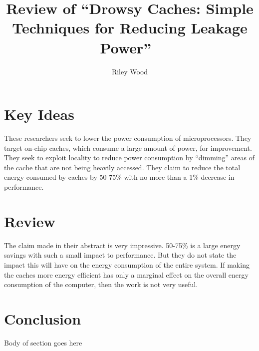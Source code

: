 \documentclass{article}
\title{Review of ``Drowsy Caches: Simple Techniques for Reducing Leakage
Power''~\cite{drowsy}}
\author{Riley Wood}
\begin{document}
\maketitle


\section*{Key Ideas}
These researchers seek to lower the power consumption of microprocessors. They
target on-chip caches, which consume a large amount of power, for improvement.
They seek to exploit locality to reduce power consumption by ``dimming'' areas
of the cache that are not being heavily accessed. They claim to reduce the total
energy consumed by caches by 50-75\% with no more than a 1\% decrease in
performance.

\section*{Review}
The claim made in their abstract is very impressive. 50-75\% is a large energy
savings with such a small impact to performance. But they do not state the
impact this will have on the energy consumption of the entire system. If making
the caches more energy efficient has only a marginal effect on the overall
energy consumption of the computer, then the work is not very useful.

\section*{Conclusion}
Body of section goes here




\end{document}
